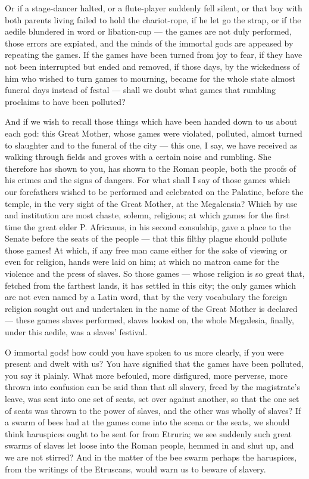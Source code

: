  Or if a stage-dancer halted, or a flute-player suddenly fell silent, or that boy with both parents living failed to hold the chariot-rope, if he let go the strap, or if the aedile blundered in word or libation-cup --- the games are not duly performed, those errors are expiated, and the minds of the immortal gods are appeased by repeating the games. If the games have been turned from joy to fear, if they have not been interrupted but ended and removed, if those days, by the wickedness of him who wished to turn games to mourning, became for the whole state almost funeral days instead of festal --- shall we doubt what games that rumbling proclaims to have been polluted?

 And if we wish to recall those things which have been handed down to us about each god: this Great Mother, whose games were violated, polluted, almost turned to slaughter and to the funeral of the city --- this one, I say, we have received as walking through fields and groves with a certain noise and rumbling. She therefore has shown to you, has shown to the Roman people, both the proofs of his crimes and the signs of dangers. For what shall I say of those games which our forefathers wished to be performed and celebrated on the Palatine, before the temple, in the very sight of the Great Mother, at the Megalensia? Which by use and institution are most chaste, solemn, religious; at which games for the first time the great elder P. Africanus, in his second consulship, gave a place to the Senate before the seats of the people --- that this filthy plague should pollute those games! At which, if any free man came either for the sake of viewing or even for religion, hands were laid on him; at which no matron came for the violence and the press of slaves. So those games --- whose religion is so great that, fetched from the farthest lands, it has settled in this city; the only games which are not even named by a Latin word, that by the very vocabulary the foreign religion sought out and undertaken in the name of the Great Mother is declared --- these games slaves performed, slaves looked on, the whole Megalesia, finally, under this aedile, was a slaves' festival.

 O immortal gods! how could you have spoken to us more clearly, if you were present and dwelt with us? You have signified that the games have been polluted, you say it plainly. What more befouled, more disfigured, more perverse, more thrown into confusion can be said than that all slavery, freed by the magistrate's leave, was sent into one set of seats, set over against another, so that the one set of seats was thrown to the power of slaves, and the other was wholly of slaves? If a swarm of bees had at the games come into the scena or the seats, we should think haruspices ought to be sent for from Etruria; we see suddenly such great swarms of slaves let loose into the Roman people, hemmed in and shut up, and we are not stirred? And in the matter of the bee swarm perhaps the haruspices, from the writings of the Etruscans, would warn us to beware of slavery.

